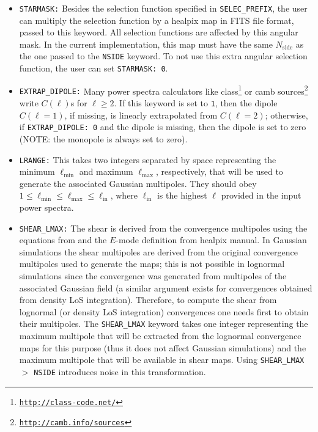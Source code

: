 \documentclass[12pt]{book} %
\newcommand{\nv}[1]{\mathrm{#1}}                 %
\begin{document}
\begin{itemize}
\item {\tt STARMASK:} Besides the selection function specified in {\tt SELEC\_PREFIX}, the user 
  can multiply the selection function by a {\sc healpix} map in FITS file format, passed to this 
  keyword. All selection functions are affected by this angular mask. In the current implementation, 
  this map must have the same $N_{\nv{side}}$ as the one passed to the {\tt NSIDE} keyword.
  To not use this extra angular selection function, the user can set {\tt STARMASK: 0}.

\item {\tt EXTRAP\_DIPOLE:} Many power spectra calculators like 
  {\sc class}\footnote{\tt{\href{http://class-code.net/}{http://class-code.net/}}} or 
  {\sc camb sources}\footnote{\tt{\href{http://camb.info/sources}{http://camb.info/sources}}} 
  write $C(\ell)$s for $\ell\geq 2$. If this keyword is set to {\tt 1}, then the dipole $C(\ell=1)$, 
  if missing, is linearly extrapolated from $C(\ell=2)$; otherwise, if {\tt EXTRAP\_DIPOLE: 0} and the 
  dipole is missing, then the dipole is set to zero (NOTE: the monopole is always set to zero).

\item {\tt LRANGE:} This takes two integers separated by space representing the minimum 
  $\ell_{\nv{min}}$ and maximum $\ell_{\nv{max}}$, respectively, that will be used to generate the 
  associated Gaussian multipoles. They should obey $1 \leq \ell_{\nv{min}} \leq \ell_{\nv{max}} \leq \ell_{\nv{in}}$, 
  where $\ell_{\nv{in}}$ is the highest $\ell$ provided in the input power spectra.

\item {\tt SHEAR\_LMAX:} The shear is derived from the convergence multipoles using the equations 
  from \citet{Hu00x} and the $E$-mode definition from {\sc healpix} manual. In Gaussian simulations 
  the shear multipoles are derived from the original convergence multipoles used to generate the maps; 
  this is not possible in lognormal simulations since the convergence was generated from multipoles of the 
  associated Gaussian field (a similar argument exists for convergences obtained from density LoS integration). 
  Therefore, to compute the shear from lognormal (or density LoS integration) convergences one needs first to 
  obtain their multipoles. The {\tt SHEAR\_LMAX} keyword takes one integer representing 
  the maximum multipole that will be extracted from the lognormal convergence maps for this purpose (thus it 
  does not affect Gaussian simulations) and the maximum multipole that will be available in shear maps. 
  Using {\tt SHEAR\_LMAX} $>$ {\tt NSIDE} introduces noise in this transformation.
  

\end{itemize}
\end{document}
